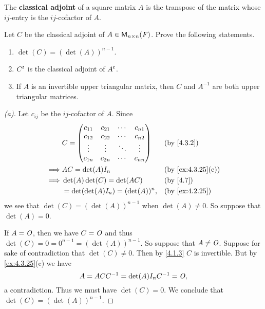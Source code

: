 \begin{defn}\label{4.3.2}
	The \textbf{classical adjoint} of a square matrix \(A\) is the transpose of the matrix whose \(i j\)-entry is the \(i j\)-cofactor of \(A\).
\end{defn}

\setcounter{ex}{26}
\begin{ex}\label{ex:4.3.27}
	Let \(C\) be the classical adjoint of \(A \in \mathsf{M}_{{n} \times n}({\mathit{F}})\).
	Prove the following statements.
	\begin{enumerate}
		\item \(\det(C) = (\det(A))^{n - 1}\).
		\item \({C}^{t}\) is the classical adjoint of \({A}^{t}\).
		\item If \(A\) is an invertible upper triangular matrix, then \(C\) and \(A^{-1}\) are both upper triangular matrices.
	\end{enumerate}
\end{ex}

\begin{proof}[(a)]
	Let \(c_{i j}\) be the \(i j\)-cofactor of \(A\).
	Since
	\begin{align*}
		         & C = \begin{pmatrix}
			               c_{1 1} & c_{2 1} & \cdots & c_{n 1} \\
			               c_{1 2} & c_{2 2} & \cdots & c_{n 2} \\
			               \vdots  & \vdots  & \ddots & \vdots  \\
			               c_{1 n} & c_{2 n} & \cdots & c_{n n}
		               \end{pmatrix} &  & \by{4.3.2}                       \\
		\implies & AC = \det(A) I_n                        &  & \by{ex:4.3.25}[c] \\
		\implies & \det(A) \det(C) = \det(AC)              &  & \by{4.7}          \\
		         & = \det(\det(A) I_n) = (\det(A))^n,      &  & \by{ex:4.2.25}
	\end{align*}
	we see that \(\det(C) = (\det(A))^{n - 1}\) when \(\det(A) \neq 0\).
	So suppose that \(\det(A) = 0\).

	If \(A = \mathit{O}\), then we have \(C = \mathit{O}\) and thus \(\det(C) = 0 = 0^{n - 1} = (\det(A))^{n - 1}\).
	So suppose that \(A \neq \mathit{O}\).
	Suppose for sake of contradiction that \(\det(C) \neq 0\).
	Then by \cref{4.1.3} \(C\) is invertible.
	But by \cref{ex:4.3.25}(c) we have
	\[
		A = A C C^{-1} = \det(A) I_n C^{-1} = \mathit{O},
	\]
	a contradiction.
	Thus we must have \(\det(C) = 0\).
	We conclude that \(\det(C) = (\det(A))^{n - 1}\).
\end{proof}

